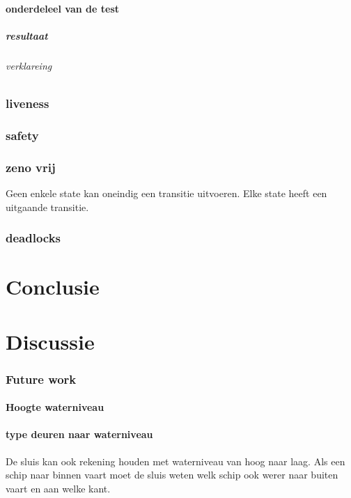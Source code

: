 \documentclass[11pt]{report} %
\begin{document}
\subsubsection{onderdeleel van de test}
\paragraph{resultaat}
\subparagraph{verklareing}


\subsection{liveness}


\subsection{safety}


\subsection{zeno vrij}
Geen enkele state kan oneindig een transitie uitvoeren. Elke state heeft een uitgaande transitie.

\subsection{deadlocks}

\chapter{Conclusie}




\chapter{Discussie}

\subsection{Future work}
\subsubsection{Hoogte waterniveau}

\subsubsection{type deuren naar waterniveau}
De sluis kan ook rekening houden met waterniveau van hoog naar laag.
Als een schip naar binnen vaart moet de sluis weten welk schip ook werer naar buiten vaart en aan welke kant.
\end{document}
